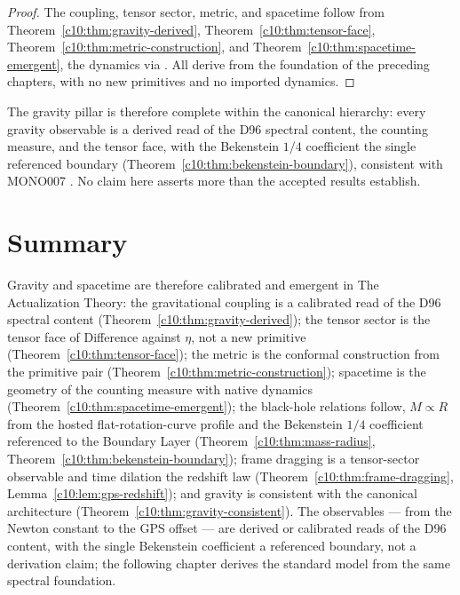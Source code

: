 \begin{proof}
The coupling, tensor sector, metric, and spacetime follow from
Theorem~\ref{c10:thm:gravity-derived}, Theorem~\ref{c10:thm:tensor-face},
Theorem~\ref{c10:thm:metric-construction}, and Theorem~\ref{c10:thm:spacetime-emergent}, the
dynamics via \cite{c10:QG222}. All derive from the foundation of the preceding chapters,
with no new primitives and no imported dynamics.
\end{proof}

The gravity pillar is therefore complete within the canonical hierarchy: every gravity
observable is a derived read of the D96 spectral content, the counting measure, and the
tensor face, with the Bekenstein $1/4$ coefficient the single referenced boundary
(Theorem~\ref{c10:thm:bekenstein-boundary}), consistent with MONO007 \cite{c10:MONO007}. No
claim here asserts more than the accepted results establish.

\section{Summary}
\label{c10:sec:gravity-summary}

Gravity and spacetime are therefore calibrated and emergent in The Actualization Theory: the
gravitational coupling is a calibrated read of the D96
spectral content (Theorem~\ref{c10:thm:gravity-derived}); the tensor sector is the tensor
face of Difference against $\eta$, not a new primitive (Theorem~\ref{c10:thm:tensor-face});
the metric is the conformal construction from the primitive pair
(Theorem~\ref{c10:thm:metric-construction}); spacetime is the geometry of the counting
measure with native dynamics (Theorem~\ref{c10:thm:spacetime-emergent}); the black-hole
relations follow, $M \propto R$ from the hosted flat-rotation-curve profile and the
Bekenstein $1/4$ coefficient referenced to
the Boundary Layer
(Theorem~\ref{c10:thm:mass-radius}, Theorem~\ref{c10:thm:bekenstein-boundary}); frame
dragging is a tensor-sector observable and time dilation the redshift law
(Theorem~\ref{c10:thm:frame-dragging}, Lemma~\ref{c10:lem:gps-redshift}); and gravity is
consistent with the canonical architecture (Theorem~\ref{c10:thm:gravity-consistent}). The
observables --- from the Newton constant to the GPS offset --- are derived or calibrated
reads of the D96 content, with the single
Bekenstein coefficient a referenced boundary, not a derivation claim; the following chapter
derives the standard model from the same spectral foundation.

